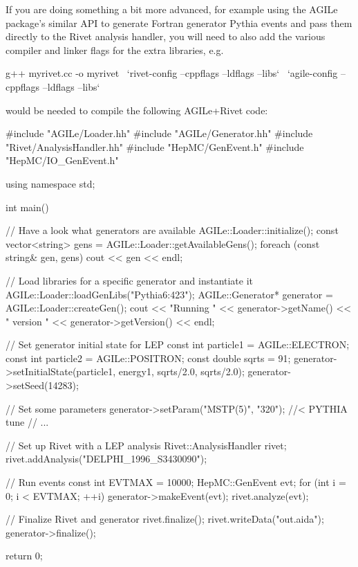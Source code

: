 \documentclass{JHEP3}
\begin{document}
If you are doing something a bit more advanced, for example using the AGILe
package's similar API to generate Fortran generator Pythia events and pass them
directly to the Rivet analysis handler, you will need to also add the various
compiler and linker flags for the extra libraries, e.g.
%
\begin{snippet}
g++ myrivet.cc -o myrivet \
  `rivet-config --cppflags --ldflags --libs` \
  `agile-config --cppflags --ldflags --libs`
\end{snippet}
%
would be needed to compile the following AGILe+Rivet code:
%
\goodbreak
\begin{snippet}
#include "AGILe/Loader.hh"
#include "AGILe/Generator.hh"
#include "Rivet/AnalysisHandler.hh"
#include "HepMC/GenEvent.h"
#include "HepMC/IO_GenEvent.h"

using namespace std;

int main() {
  // Have a look what generators are available
  AGILe::Loader::initialize();
  const vector<string> gens = AGILe::Loader::getAvailableGens();
  foreach (const string& gen, gens) {
    cout << gen << endl;
  }

  // Load libraries for a specific generator and instantiate it
  AGILe::Loader::loadGenLibs("Pythia6:423");
  AGILe::Generator* generator = AGILe::Loader::createGen();
  cout << "Running " << generator->getName()
       << " version " << generator->getVersion() << endl;

  // Set generator initial state for LEP
  const int particle1 = AGILe::ELECTRON;
  const int particle2 = AGILe::POSITRON;
  const double sqrts = 91;
  generator->setInitialState(particle1, energy1, sqrts/2.0, sqrts/2.0);
  generator->setSeed(14283);

  // Set some parameters
  generator->setParam("MSTP(5)", "320"); //< PYTHIA tune
  // ...

  // Set up Rivet with a LEP analysis
  Rivet::AnalysisHandler rivet;
  rivet.addAnalysis("DELPHI_1996_S3430090");

  // Run events
  const int EVTMAX = 10000;
  HepMC::GenEvent evt;
  for (int i = 0; i < EVTMAX; ++i) {
    generator->makeEvent(evt);
    rivet.analyze(evt);
  }

  // Finalize Rivet and generator
  rivet.finalize();
  rivet.writeData("out.aida");
  generator->finalize();

  return 0;
}
\end{snippet}
\end{document}
